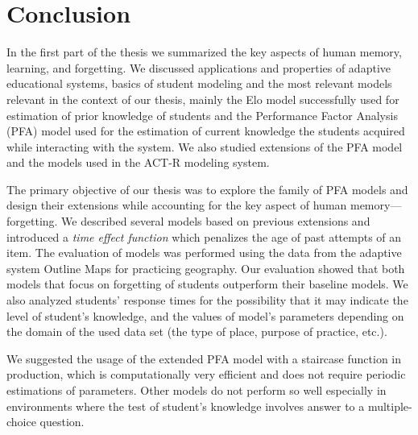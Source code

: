 \chapter{Conclusion}

In the first part of the thesis we summarized the key aspects of human memory, learning, and forgetting. We discussed applications and properties of adaptive educational systems, basics of student modeling and the most relevant models relevant in the context of our thesis, mainly the Elo model successfully used for estimation of prior knowledge of students and the Performance Factor Analysis (PFA) model used for the estimation of current knowledge the students acquired while interacting with the system. We also studied extensions of the PFA model and the models used in the ACT-R modeling system.

The primary objective of our thesis was to explore the family of PFA models and design their extensions while accounting for the key aspect of human memory---forgetting. We described several models based on previous extensions and introduced a \textit{time effect function} which penalizes the age of past attempts of an item. The evaluation of models was performed using the data from the adaptive system Outline Maps for practicing geography. Our evaluation showed that both models that focus on forgetting of students outperform their baseline models. We also analyzed students' response times for the possibility that it may indicate the level of student's knowledge, and the values of model's parameters depending on the domain of the used data set (the type of place, purpose of practice, etc.).

We suggested the usage of the extended PFA model with a staircase function in production, which is computationally very efficient and does not require periodic estimations of parameters. Other models do not perform so well especially in environments where the test of student's knowledge involves answer to a multiple-choice question.
